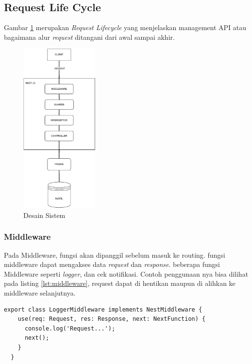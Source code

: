 \subsection{Request Life Cycle}
Gambar \ref{sistem-desain} merupakan \textit{Request Lifecycle} yang menjelaskan management API atau bagaimana alur \textit{request} ditangani dari awal sampai akhir.
\begin{figure}[h]
	\centering
	\includegraphics[width=0.35\textwidth]{drawio/sistem-desain.drawio.pdf}
	\caption{Desain Sistem}
	\label{sistem-desain}
\end{figure}
\subsubsection{Middleware}
Pada Middleware, fungsi akan dipanggil sebelum masuk ke routing. fungsi middleware dapat mengakses data \textit{request} dan \textit{response}. beberapa fungsi Middleware seperti \textit{logger}, dan cek notifikasi. Contoh penggunaan nya bisa dilihat pada listing \ref{lst:middleware}, request dapat di hentikan maupun di alihkan ke middleware selanjutnya.
\begin{lstlisting}[caption={Middleware},label={lst:middleware}]
  export class LoggerMiddleware implements NestMiddleware {
    use(req: Request, res: Response, next: NextFunction) {
      console.log('Request...');
      next();
    }
  }  
\end{lstlisting}

